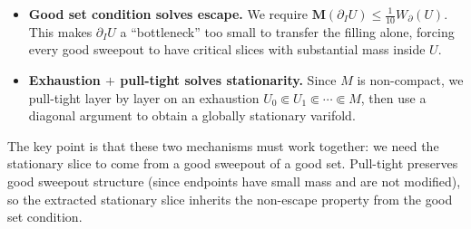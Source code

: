 \begin{itemize}
    \item \textbf{Good set condition solves escape.} We require $\mathbf{M}(\partial_I U) \leq \frac{1}{10} W_\partial(U)$. This makes $\partial_I U$ a ``bottleneck'' too small to transfer the filling alone, forcing every good sweepout to have critical slices with substantial mass inside $U$.

    \item \textbf{Exhaustion $+$ pull-tight solves stationarity.} Since $M$ is non-compact, we pull-tight layer by layer on an exhaustion $U_0 \Subset U_1 \Subset \cdots \Subset M$, then use a diagonal argument to obtain a globally stationary varifold.
\end{itemize}

The key point is that these two mechanisms must work together: we need the stationary slice to come from a good sweepout of a good set. Pull-tight preserves good sweepout structure (since endpoints have small mass and are not modified), so the extracted stationary slice inherits the non-escape property from the good set condition.

